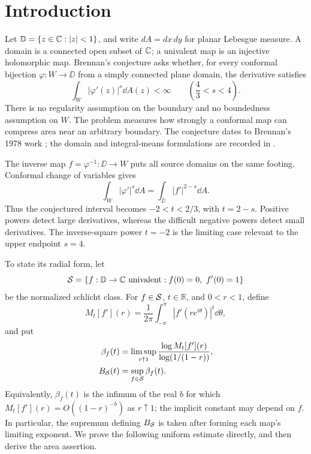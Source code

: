 \section{Introduction}
\label{sec:introduction}

Let $\mathbb D=\{z\in\mathbb C:|z|<1\}$, and write $dA=dx\,dy$ for planar
Lebesgue measure. A domain is a connected open subset of $\mathbb C$; a
univalent map is an injective holomorphic map. Brennan's conjecture asks
whether, for every conformal bijection $\varphi:W\to\DD$ from a simply
connected plane domain, the derivative satisfies
\[
 \int_W|\varphi'(z)|^s\dd A(z)<\infty
 \qquad\left(\frac43<s<4\right).
\]
There is no regularity assumption on the boundary and no boundedness
assumption on $W$. The problem measures how strongly a conformal map can
compress area near an arbitrary boundary. The conjecture dates to
Brennan's 1978 work \cite{Brennan1978}; the domain and integral-means
formulations are recorded in \cite[Chapter~3]{Bertilsson1999}.

The inverse map $f=\varphi^{-1}:\DD\to W$ puts all source domains on
the same footing. Conformal change of variables gives
\begin{equation}\label{eq:inverse-area}
 \int_W|\varphi'|^s\dd A
 =\int_{\DD}|f'|^{2-s}\dd A.
\end{equation}
Thus the conjectured interval becomes $-2<t<2/3$, with $t=2-s$.
Positive powers detect large derivatives, whereas the difficult negative
powers detect small derivatives. The inverse-square power $t=-2$ is
the limiting case relevant to the upper endpoint $s=4$.

To state its radial form, let
\[
 \SSS=\{f:\DD\to\CC\text{ univalent}:f(0)=0,\ f'(0)=1\}
\]
be the normalized schlicht class. For $f\in\mathcal S$, $t\in\mathbb R$,
and $0<r<1$, define
\[
 M_t[f'](r)=\frac1{2\pi}\int_{-\pi}^{\pi}
                  |f'(re^{i\theta})|^t\dd\theta,
\]
and put
\begin{align*}
 \beta_f(t)&=\limsup_{r\uparrow1}
       \frac{\log M_t[f'](r)}{\log(1/(1-r))},\\
 B_{\mathcal S}(t)&=\sup_{f\in\mathcal S}\beta_f(t).
\end{align*}
Equivalently, $\beta_f(t)$ is the infimum of the real $b$ for which
$M_t[f'](r)=O((1-r)^{-b})$ as $r\uparrow1$; the implicit constant may
depend on $f$. In particular, the supremum defining $B_{\mathcal S}$ is taken after forming
each map's limiting exponent. We prove the following uniform estimate
directly, and then derive the area assertion.

